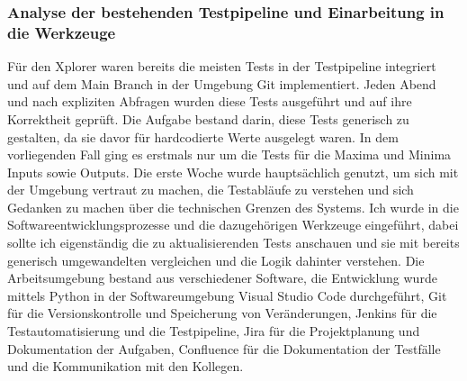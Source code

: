\documentclass[12pt]{article} %
\begin{document}
\subsubsection{Analyse der bestehenden Testpipeline und Einarbeitung in die Werkzeuge}
Für den Xplorer waren bereits die meisten Tests in der Testpipeline integriert und auf dem Main Branch in der Umgebung Git implementiert. Jeden Abend und nach expliziten Abfragen wurden diese Tests ausgeführt und auf ihre Korrektheit geprüft.
Die Aufgabe bestand darin, diese Tests generisch zu gestalten, da sie davor für hardcodierte Werte ausgelegt waren. In dem vorliegenden Fall ging es erstmals nur um die Tests für die Maxima und Minima Inputs sowie Outputs. Die erste Woche wurde hauptsächlich genutzt, um sich mit der Umgebung vertraut zu machen, die Testabläufe zu verstehen und sich Gedanken zu machen über die technischen Grenzen des Systems.
Ich wurde in die Softwareentwicklungsprozesse und die dazugehörigen Werkzeuge eingeführt, dabei sollte ich eigenständig die zu aktualisierenden Tests anschauen und sie mit bereits generisch umgewandelten vergleichen und die Logik dahinter verstehen.
Die Arbeitsumgebung bestand aus verschiedener Software, die Entwicklung wurde mittels Python in der Softwareumgebung Visual Studio Code durchgeführt, Git für die Versionskontrolle und Speicherung von Veränderungen, Jenkins für die Testautomatisierung und die Testpipeline, Jira für die Projektplanung und Dokumentation der Aufgaben, Confluence für die Dokumentation der Testfälle und die Kommunikation mit den Kollegen.
\\
\\
\end{document}
